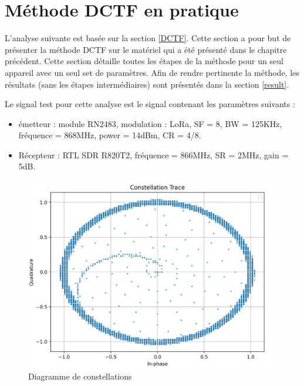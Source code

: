 
\section{Méthode DCTF en pratique}\label{pra}

L'analyse suivante est basée sur la section \ref{DCTF}. Cette section a pour but de présenter la méthode \ac{DCTF} sur le matériel qui a été présenté dans le chapitre précédent. Cette section détaille toutes les étapes de la méthode pour un seul appareil avec un seul set de paramètres. Afin de rendre pertinente la méthode, les résultats (sans les étapes intermédiaires) sont présentés dans la section \ref{result}.

Le signal test pour cette analyse est le signal contenant les paramètres suivants :

\vspace{0.1cm}

\begin{itemize}
\item émetteur : module RN2483, modulation : LoRa, \ac{SF} = 8, \ac{BW} = 125KHz, fréquence = 868MHz, power = 14dBm, \ac{CR} = 4/8.
\item Récepteur : RTL SDR R820T2, fréquence = 866MHz, \ac{SR} = 2MHz, gain = 5dB.
\end{itemize}

\begin{figure}[h]
\centering

\includegraphics[scale=0.25]{images/dctf1.png}
\caption{Diagramme de constellations}\label{term314}
\end{figure}


